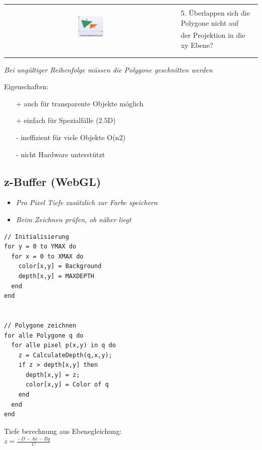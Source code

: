 \begin{tabular}{cl}
  \multirow{3}{*}{
    \includegraphics[width=0.15\textwidth]{assets/paintersalg-polygon-overlapping.png}
  } & \\
  & 5. Überlappen sich die Polygone nicht auf \\
  & der Projektion in die xy Ebene? \\
  & \\
  & \\
\end{tabular}

\textit{Bei ungültiger Reihenfolge müssen die Polygone geschnitten werden}

Eigenschaften:
\begin{itemize}
  \item[+] auch für transparente Objekte möglich
  \item[+] einfach für Spezialfälle (2.5D)
  \item[-] ineffizient für viele Objekte O(n2)
  \item[-] nicht Hardware unterstützt
\end{itemize}

\subsection{z-Buffer (WebGL)}
\begin{itemize}
  \item \textit{Pro Pixel Tiefe zusätzlich zur Farbe speichern}
  \item \textit{Beim Zeichnen prüfen, ob näher liegt}
\end{itemize}

\begin{lstlisting}
// Initialisierung
for y = 0 to YMAX do
  for x = 0 to XMAX do
    color[x,y] = Background
    depth[x,y] = MAXDEPTH
  end
end


// Polygone zeichnen
for alle Polygone q do
  for alle pixel p(x,y) in q do
    z = CalculateDepth(q,x,y);
    if z > depth[x,y] then
      depth[x,y] = z;
      color[x,y] = Color of q
    end
  end
end
\end{lstlisting}

Tiefe berechnung aus Ebenegleichung: \\
$z = \frac{-D - Ax - By}{C}$ \\

